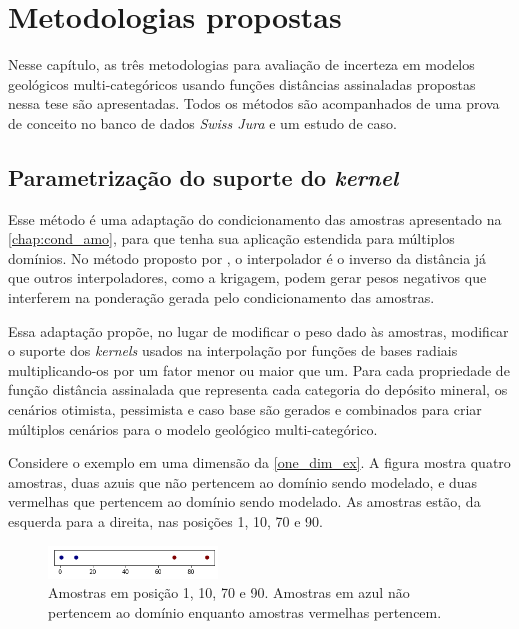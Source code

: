 \chapter{Metodologias propostas}\label{chap3}

Nesse capítulo, as três metodologias para avaliação de incerteza em modelos geológicos multi-categóricos usando funções distâncias assinaladas propostas nessa tese são apresentadas. Todos os métodos são acompanhados de uma prova de conceito no banco de dados \textit{Swiss Jura} e um estudo de caso. 

\section{Parametrização do suporte do \textit{kernel}}\label{kernel_fac}

Esse método é uma adaptação do condicionamento das amostras apresentado na \autoref{chap:cond_amo}, para que tenha sua aplicação estendida para múltiplos domínios. No método proposto por , o interpolador é o inverso da distância já que outros interpoladores, como a krigagem, podem gerar pesos negativos que interferem na ponderação gerada pelo condicionamento das amostras.

Essa adaptação propõe, no lugar de modificar o peso dado às amostras, modificar o suporte dos \textit{kernels} usados na interpolação por funções de bases radiais multiplicando-os por um fator menor ou maior que um. Para cada propriedade de função distância assinalada que representa cada categoria do depósito mineral, os cenários otimista, pessimista e caso base são gerados e combinados para criar múltiplos cenários para o modelo geológico multi-categórico.

Considere o exemplo em uma dimensão da \autoref{one_dim_ex}. A figura mostra quatro amostras, duas azuis que não pertencem ao domínio sendo modelado, e duas vermelhas que pertencem ao domínio sendo modelado. As amostras estão, da esquerda para a direita, nas posições 1, 10, 70 e 90.

\begin{figure}[H]
	\caption{\label{one_dim_ex} Amostras em posição 1, 10, 70 e 90. Amostras em azul não pertencem ao domínio enquanto amostras vermelhas pertencem.}
	\centering
		\includegraphics[width=0.4\textwidth]{capitulo_3/imagens/pointssd.png}
\end{figure}

